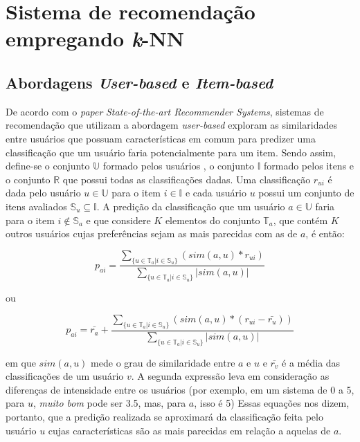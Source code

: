 \section{Sistema de recomendação empregando \textit{k}-NN}

\subsection {Abordagens \textit{User-based} e \textit{Item-based}}

De acordo com o \textit{paper} \textit{State-of-the-art Recommender Systems},
sistemas de recomendação que utilizam a abordagem \textit{user-based} exploram
as similaridades entre usuários que possuam características em comum para
predizer uma classificação que um usuário faria potencialmente para um item.
Sendo assim, define-se o conjunto \(\mathbb{U}\) formado pelos usuários , o
conjunto \(\mathbb{I}\) formado pelos itens e  o conjunto \(\mathbb{R}\) que
possui todas as classificações dadas.  Uma classificação \(r_{ui}\) é dada pelo
usuário \(u\in \mathbb{U}\) para o item \(i\in \mathbb{I}\)  e cada usuário
\(u\) possui um conjunto de itens avaliados \(\mathbb{S}_u \subseteq
\mathbb{I}\). A predição da classificação que um usuário \(a\in\mathbb{U}\)
faria para o item \(i \notin \mathbb{S}_a\) e que considere \(K\) elementos do
conjunto \(\mathbb{T}_a\), que contém \(K\) outros usuários cujas
preferências sejam as mais parecidas com as de \(a\), é então:

\begin{equation}
p_{ai} = \frac{\sum_{\{ u\in \mathbb{T}_a | i\in \mathbb{S}_u \}} \left(
sim(a,u) * r_{ui} \right)}{\sum_{\{ u\in \mathbb{T}_a | i\in \mathbb{S}_u \}}
\left| sim(a,u)\right|}
\end{equation}

ou

\begin{equation}
p_{ai} = \bar{r_a} + \frac{\sum_{\{ u\in \mathbb{T}_a | i\in \mathbb{S}_u \}}
\left( sim(a,u) * (r_{ui} - \bar{r_u})\right)}{\sum_{\{ u\in \mathbb{T}_a | i\in
\mathbb{S}_u \}} \left| sim(a,u)\right|}
\end{equation}

em que \(sim(a,u)\) mede o grau de similaridade entre \(a\) e \(u\) e
\(\bar{r_v}\) é a média das classificações de um usuário \(v\). A segunda
expressão leva em consideração as diferenças de intensidade entre os usuários
(por exemplo, em um sistema de 0 a 5, para \(u\), \textit{muito bom} pode ser
3.5, mas, para \(a\), isso é 5) Essas equações nos dizem, portanto, que a
predição realizada se aproximará da classificação feita pelo usuário \(u\) cujas
características são as mais parecidas em relação a aquelas de \(a\).

